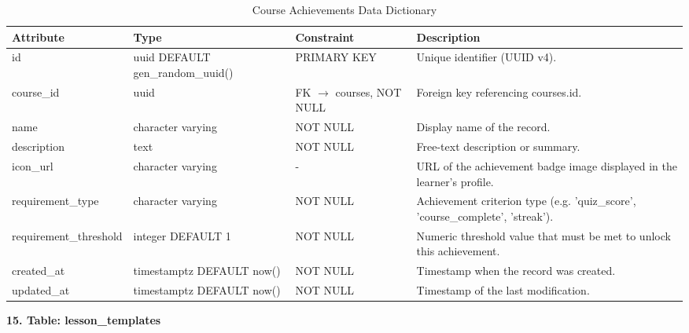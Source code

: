 \documentclass[12pt, oneside]{article} %
\newcommand{\tabbreak}{\hyphenpenalty=200\exhyphenpenalty=200\tolerance=4000\hbadness=10000\hspace{0pt}}
\begin{document}
\begin{table}[H]
\caption{Course Achievements Data Dictionary}
\label{tab:dd_course_achievements}
\vspace{-4mm}
\begin{center}
\renewcommand{\arraystretch}{1.15}
\scriptsize
\begin{tabular}{|>{\raggedright\arraybackslash\tabbreak}p{2.67cm}|>{\raggedright\arraybackslash\tabbreak}p{2.93cm}|>{\raggedright\arraybackslash\tabbreak}p{2.67cm}|>{\raggedright\arraybackslash\tabbreak}p{4.51cm}|}
\hline
\textbf{Attribute} & \textbf{Type} & \textbf{Constraint} & \textbf{Description} \\ \hline
id & uuid DEFAULT gen\_random\_uuid() & PRIMARY KEY & Unique identifier (UUID v4). \\ \hline
course\_id & uuid & FK $\rightarrow$ courses, NOT NULL & Foreign key referencing courses.id. \\ \hline
name & character varying & NOT NULL & Display name of the record. \\ \hline
description & text & NOT NULL & Free-text description or summary. \\ \hline
icon\_url & character varying & - & URL of the achievement badge image displayed in the learner's profile. \\ \hline
requirement\_type & character varying & NOT NULL & Achievement criterion type (e.g. 'quiz\_score', 'course\_complete', 'streak'). \\ \hline
requirement\_threshold & integer DEFAULT 1 & NOT NULL & Numeric threshold value that must be met to unlock this achievement. \\ \hline
created\_at & timestamptz DEFAULT now() & NOT NULL & Timestamp when the record was created. \\ \hline
updated\_at & timestamptz DEFAULT now() & NOT NULL & Timestamp of the last modification. \\ \hline
\end{tabular}
\end{center}
\end{table}

\textbf{15. Table: lesson\_templates}
\end{document}
